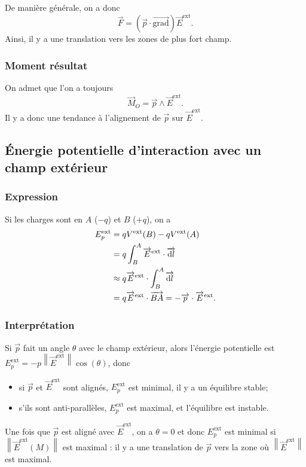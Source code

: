 De manière générale, on a donc
\begin{equation}
    \boxed{
        \vec{F}=\left(\vec{p}\cdot\vec{\mathrm{grad}}\right)\vec{E}^{\mathrm{ext}}.
    }
\end{equation}
Ainsi, il y a une translation vers les zones de plus fort champ.

\subsubsection{Moment résultat}

On admet que l'on a toujours
\begin{equation}
    \boxed{
        \vec{M}_O=\vec{p}\wedge\vec{E}^{\mathrm{ext}}.
    }
\end{equation}
Il y a donc une tendance à l'alignement de $\vec{p}$ sur $\vec{E}^{\mathrm{ext}}$.

\subsection{Énergie potentielle d'interaction avec un champ extérieur}
\subsubsection{Expression}
Si les charges sont en $A$ ($-q$) et $B$ ($+q$), on a 
\begin{align}
    E_{p}^{\mathrm{ext}}
    &=
    qV^{\mathrm{ext}}(B)-qV^{\mathrm{ext}}(A)\\
    &=
    q\int_{B}^{A}\protect\overrightarrow{{E}}^{\mathrm{ext}}\cdot\protect\overrightarrow{{\mathrm{d} l}}\\
    &
    \approx q\protect\overrightarrow{{E}}^{\mathrm{ext}}\cdot\int_{B}^{A}\protect\overrightarrow{{\mathrm{d} l}}\\
    &=
    q\protect\overrightarrow{{E}}^{\mathrm{ext}}\cdot\protect\overrightarrow{{BA}}=-\protect\overrightarrow{{p}}\cdot\protect\overrightarrow{{E}}^{\mathrm{ext}}.
\end{align}

\subsubsection{Interprétation}

Si $\vec{p}$ fait un angle $\theta$ avec le champ extérieur, alors l'énergie potentielle est~$E_p^{\mathrm{ext}}=-p\left\lVert\vec{E}^{\mathrm{ext}}\right\rVert\cos(\theta)$, donc
\begin{itemize}
    \item si $\vec{p}$ et $\vec{E}^{\mathrm{ext}}$ sont alignés, $E_p^{\mathrm{ext}}$ est minimal, il y a un équilibre stable;
    \item s'ils sont anti-parallèles, $E_p^{\mathrm{ext}}$ est maximal, et l'équilibre est instable.
\end{itemize}

Une fois que $\vec{p}$ est aligné avec $\vec{E}^{\mathrm{ext}}$, on a $\theta=0$ et donc $E_p^{\mathrm{ext}}$ est minimal si $\left\lVert\vec{E}^{\mathrm{ext}}(M)\right\rVert$ est maximal : il y a une translation de $\vec{p}$ vers la zone où $\left\lVert \vec{E}^{\mathrm{ext}}\right\rVert$ est maximal.